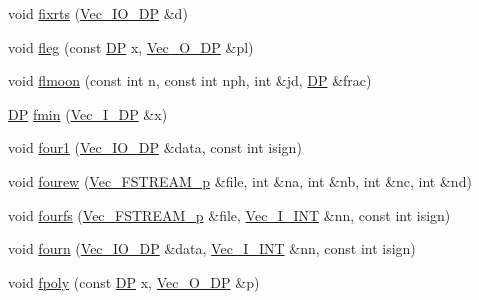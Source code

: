 \begin{DoxyCompactItemize}
\item 
void \mbox{\hyperlink{namespaceNR_abd5e28d80b44e108348ecc80785afa7c}{fixrts}} (\mbox{\hyperlink{namespaceNR_ab293e06a6bf799d8a7ed932b6852bcb8}{Vec\+\_\+\+I\+O\+\_\+\+DP}} \&d)
\item 
void \mbox{\hyperlink{namespaceNR_a069ca1a540d6d9637ab168a19fc6d86d}{fleg}} (const \mbox{\hyperlink{namespaceNR_af6ff762dd605ff477b8e52387253a02a}{DP}} x, \mbox{\hyperlink{namespaceNR_a970094d23441f8ef6a45282a7eb2103d}{Vec\+\_\+\+O\+\_\+\+DP}} \&pl)
\item 
void \mbox{\hyperlink{namespaceNR_afd394882e21b8378572c186fb66220af}{flmoon}} (const int n, const int nph, int \&jd, \mbox{\hyperlink{namespaceNR_af6ff762dd605ff477b8e52387253a02a}{DP}} \&frac)
\item 
\mbox{\hyperlink{namespaceNR_af6ff762dd605ff477b8e52387253a02a}{DP}} \mbox{\hyperlink{namespaceNR_a570c7b20deac021db5e798650ceb157f}{fmin}} (\mbox{\hyperlink{namespaceNR_a9f943da53862537c552e2a770cb170ae}{Vec\+\_\+\+I\+\_\+\+DP}} \&x)
\item 
void \mbox{\hyperlink{namespaceNR_aaff3ae4c060df78a4b5da02651af126d}{four1}} (\mbox{\hyperlink{namespaceNR_ab293e06a6bf799d8a7ed932b6852bcb8}{Vec\+\_\+\+I\+O\+\_\+\+DP}} \&data, const int isign)
\item 
void \mbox{\hyperlink{namespaceNR_a8dd403b5378f2cc7dec76ae5b837f05d}{fourew}} (\mbox{\hyperlink{namespaceNR_ace6a74f7f9700e1416d49842d8ac29ea}{Vec\+\_\+\+F\+S\+T\+R\+E\+A\+M\+\_\+p}} \&file, int \&na, int \&nb, int \&nc, int \&nd)
\item 
void \mbox{\hyperlink{namespaceNR_a9d15130e265a84a6b1e78c63c1af4e34}{fourfs}} (\mbox{\hyperlink{namespaceNR_ace6a74f7f9700e1416d49842d8ac29ea}{Vec\+\_\+\+F\+S\+T\+R\+E\+A\+M\+\_\+p}} \&file, \mbox{\hyperlink{namespaceNR_ae67ce7dc86a8a64a7ce73c3c030ff610}{Vec\+\_\+\+I\+\_\+\+I\+NT}} \&nn, const int isign)
\item 
void \mbox{\hyperlink{namespaceNR_a71c761e2cf4f3d12a0b1043d5ead1b09}{fourn}} (\mbox{\hyperlink{namespaceNR_ab293e06a6bf799d8a7ed932b6852bcb8}{Vec\+\_\+\+I\+O\+\_\+\+DP}} \&data, \mbox{\hyperlink{namespaceNR_ae67ce7dc86a8a64a7ce73c3c030ff610}{Vec\+\_\+\+I\+\_\+\+I\+NT}} \&nn, const int isign)
\item 
void \mbox{\hyperlink{namespaceNR_ab4c354c01223108b1105a957320da065}{fpoly}} (const \mbox{\hyperlink{namespaceNR_af6ff762dd605ff477b8e52387253a02a}{DP}} x, \mbox{\hyperlink{namespaceNR_a970094d23441f8ef6a45282a7eb2103d}{Vec\+\_\+\+O\+\_\+\+DP}} \&p)
\item 

\end{DoxyCompactItemize}
